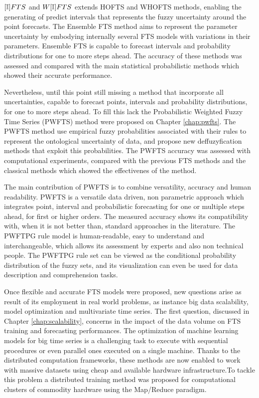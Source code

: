 $[\mathbb{I}]FTS$ and $W[\mathbb{I}]FTS$ extends HOFTS and WHOFTS methods, enabling the generating of predict intervals that represents the fuzzy uncertainty around the point forecasts. The Ensemble FTS method aims to represent the parameter uncertainty by embodying internally several FTS models with variations in their parameters. Ensemble FTS is capable to forecast intervals and probability distributions for one to more steps ahead. The accuracy of these methods was assessed and compared with the main statistical probabilistic methods which showed their accurate performance.

Nevertheless, until this point still missing a method that incorporate all uncertainties, capable to forecast points, intervals and probability distributions, for one to more steps ahead. To fill this lack the Probabilistic Weighted Fuzzy Time Series (PWFTS) method were proposed on Chapter \ref{chap:pwfts}. The PWFTS method use empirical fuzzy probabilities associated with their rules to represent the ontological uncertainty of data, and propose new deffuzyfication methods that exploit this probabilities. The PWFTS accuracy was assessed with computational experiments, compared with the previous FTS methods and the classical methods which showed the effectivenes of the method.

The  main contribution of PWFTS is to combine versatility, accuracy and human readability. PWFTS is a versatile data driven, non parametric approach which integrates point, interval and probabilistic forecasting for one or multiple steps ahead, for first or higher orders. The measured accuracy shows its compatibility with, when it is not better than, standard approaches in the literature. The PWFTPG rule model is human-readable, easy to understand and interchangeable, which allows its assessment by experts and also non technical people. The PWFTPG rule set can be viewed as the conditional probability distribution of the fuzzy sets, and its visualization can even be used for data description and comprehension tasks.

Once flexible and accurate FTS models were proposed, new questions arise as result of its employment in real world problems, as instance big data scalability,  model optimization and multivariate time series. The first question, discussed in Chapter \ref{chap:scalability}, concerns in the impact of the data volume on FTS training and forecasting performances. The optimization of machine learning models for big time series is a challenging task to execute with sequential procedures or even parallel ones executed on a single machine. Thanks to the distributed computation frameworks, these methods are now enabled to work with massive datasets using cheap and available hardware infrastructure.To tackle this problem a distributed training method was proposed for computational clusters of commodity hardware using the Map/Reduce paradigm. 


